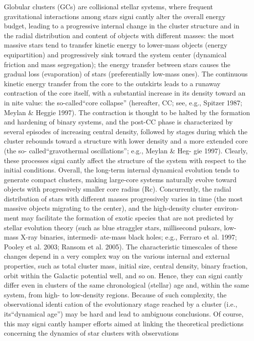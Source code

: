 \documentclass[../Main.tex]{subfiles}
\begin{document}
{Globular clusters (GCs) are collisional stellar systems, where
frequent gravitational interactions among stars signi cantly
alter the overall energy budget, leading to a progressive internal
change in the cluster structure and in the radial distribution and
content of objects with different masses: the most massive stars
tend to transfer kinetic energy to lower-mass objects (energy
equipartition) and progressively sink toward the system center
(dynamical friction and mass segregation); the energy transfer
between stars causes the gradual loss (evaporation) of stars
(preferentially low-mass ones). The continuous kinetic energy
transfer from the core to the outskirts leads to a runaway
contraction of the core itself, with a substantial increase in its
density toward an in nite value: the so-called“core collapse”
(hereafter, CC; see, e.g., Spitzer 1987; Meylan & Heggie 1997).
The contraction is thought to be halted by the formation and
hardening of binary systems, and the post-CC phase is
characterized by several episodes of increasing central density,
followed by stages during which the cluster rebounds toward a
structure with lower density and a more extended core (the so-
called“gravothermal oscillations”; e.g., Meylan & Heg-
gie 1997). Clearly, these processes signi cantly affect the
structure of the system with respect to the initial conditions.
Overall, the long-term internal dynamical evolution tends to
generate compact clusters, making large-core systems naturally
evolve toward objects with progressively smaller core radius
(Rc). Concurrently, the radial distribution of stars with different
masses progressively varies in time (the most massive objects migrating to the center), and the high-density cluster environ-
ment may facilitate the formation of exotic species that are not
predicted by stellar evolution theory (such as blue straggler
stars, millisecond pulsars, low-mass X-ray binaries, intermedi-
ate-mass black holes; e.g., Ferraro et al. 1997; Pooley et al.
2003; Ransom et al. 2005).
The characteristic timescales of these changes depend in a
very complex way on the various internal and external
properties, such as total cluster mass, initial size, central
density, binary fraction, orbit within the Galactic potential well,
and so on. Hence, they can signi cantly differ even in clusters
of the same chronological (stellar) age and, within the same
system, from high- to low-density regions. Because of such
complexity, the observational identi cation of the evolutionary
stage reached by a cluster (i.e., its“dynamical age”) may be
hard and lead to ambiguous conclusions. Of course, this may
signi cantly hamper efforts aimed at linking the theoretical
predictions concerning the dynamics of star clusters with
observations

}
\end{document}
